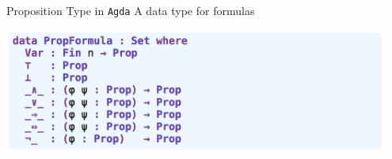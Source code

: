 \documentclass[10pt, xetex, hyperref={pdfpagelabels=false}]{beamer}
\newcommand{\prg}[1]{\texttt{#1}\xspace}
\newcommand{\Agda}{\prg{Agda}}
\newenvironment{MyAgda}{%
  \VerbatimEnvironment
  \begin{center}%
  \djvumathfont\bfseries
  \vskip 1.5mm
    \begin{minipage}{\linewidth}%
      \begin{verbatim}}
{%
      \end{verbatim}%
    \end{minipage}%
    \vskip 1.5mm
  \end{center}}
\begin{document}
\begin{frame}[fragile]{Proposition Type in \Agda}
A data type for formulas

\vfill
  \begin{center}
  \includegraphics[width=0.95\textwidth]{prop}
\end{center}
\vfill


\end{frame}
\end{document}
